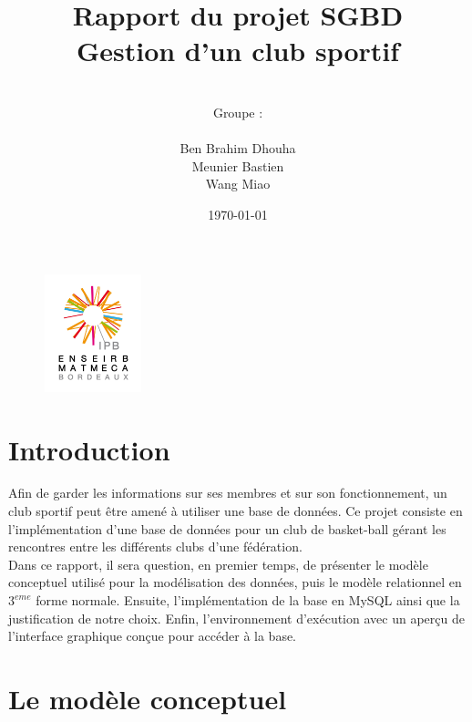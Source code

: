 \documentclass{article}
\date{\vspace{3 cm} \today}
\author{\vspace{4 cm} \\ Groupe :\\ \\Ben Brahim Dhouha\\Meunier Bastien\\Wang Miao }
\title{Rapport du projet SGBD \\ Gestion d'un club sportif}
\begin{document}
\newenvironment{narrow}[2]{%
\begin{list}{}{%
\setlength{\topsep}{0pt}%
\setlength{\leftmargin}{#1}%
\setlength{\rightmargin}{#2}%
\setlength{\listparindent}{\parindent}%
\setlength{\itemindent}{\parindent}%
\setlength{\parsep}{\parskip}%
}%
\item[]}{\end{list}}


\thispagestyle{empty}
\begin{figure}
\includegraphics[width=0.25\textwidth]{enseirb-matmeca.jpg}
\end{figure}
\maketitle

\newpage


\section*{Introduction}


Afin de garder les informations sur ses membres et sur son fonctionnement, un club sportif peut être amené à utiliser une base de données. Ce projet consiste en l'implémentation d'une base de données pour un club de basket-ball gérant les rencontres entre les différents clubs d'une fédération. \\

Dans ce rapport, il sera question, en premier temps, de présenter le modèle conceptuel utilisé pour la modélisation des données, puis le modèle relationnel en $3^{eme}$ forme normale. Ensuite, l'implémentation de la base en MySQL ainsi que la justification de notre choix. Enfin, l'environnement d'exécution avec un aperçu de l'interface graphique conçue pour accéder à la base. 


\newpage
\tableofcontents

\newpage
\section{Le modèle conceptuel}
\end{document}
